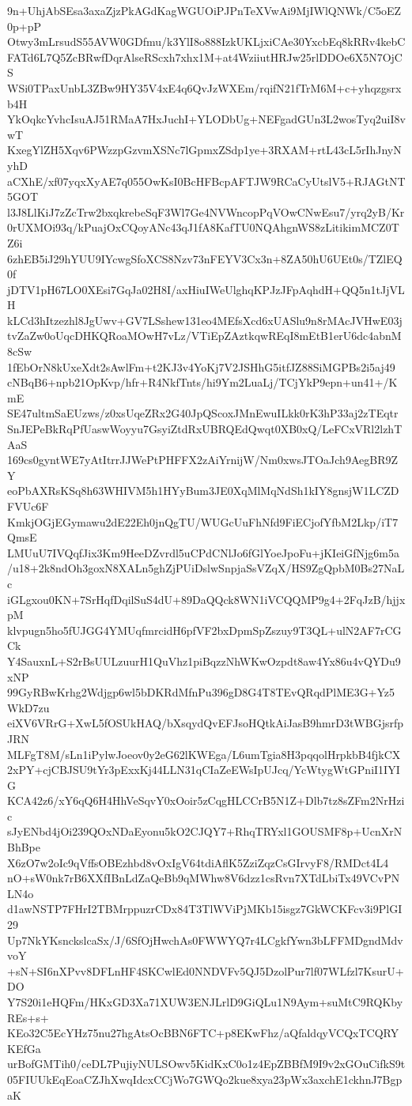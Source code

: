 9n+UhjAbSEsa3axaZjzPkAGdKagWGUOiPJPnTeXVwAi9MjIWlQNWk/C5oEZ0p+pP
Otwy3mLrsudS55AVW0GDfmu/k3YlI8o888IzkUKLjxiCAe30YxcbEq8kRRv4kebC
FATd6L7Q5ZcBRwfDqrAlseRScxh7xhx1M+at4WziiutHRJw25rlDDOe6X5N7OjCS
WSi0TPaxUnbL3ZBw9HY35V4xE4q6QvJzWXEm/rqifN21fTrM6M+c+yhqzgsrxb4H
YkOqkcYvhcIsuAJ51RMaA7HxJuchI+YLODbUg+NEFgadGUn3L2wosTyq2uiI8vwT
KxegYlZH5Xqv6PWzzpGzvmXSNc7lGpmxZSdp1ye+3RXAM+rtL43cL5rIhJnyNyhD
aCXhE/xf07yqxXyAE7q055OwKsI0BcHFBcpAFTJW9RCaCyUtslV5+RJAGtNT5GOT
l3J8LlKiJ7zZcTrw2bxqkrebeSqF3Wl7Ge4NVWncopPqVOwCNwEsu7/yrq2yB/Kr
0rUXMOi93q/kPuajOxCQoyANc43qJ1fA8KafTU0NQAhgnWS8zLitikimMCZ0TZ6i
6zhEB5iJ29hYUU9IYcwgSfoXCS8Nzv73nFEYV3Cx3n+8ZA50hU6UEt0s/TZlEQ0f
jDTV1pH67LO0XEsi7GqJa02H8I/axHiuIWeUlghqKPJzJFpAqhdH+QQ5n1tJjVLH
kLCd3hItzezhl8JgUwv+GV7LSshew131eo4MEfsXcd6xUASlu9n8rMAcJVHwE03j
tvZaZw0oUqcDHKQRoaMOwH7vLz/VTiEpZAztkqwREqI8mEtB1erU6dc4abnM8cSw
1fEbOrN8kUxeXdt2sAwlFm+t2KJ3v4YoKj7V2JSHhG5itfJZ88SiMGPBs2i5aj49
cNBqB6+npb21OpKvp/hfr+R4NkfTnts/hi9Ym2LuaLj/TCjYkP9epn+un41+/KmE
SE47ultmSaEUzws/z0xsUqeZRx2G40JpQScoxJMnEwuILkk0rK3hP33aj2zTEqtr
SnJEPeBkRqPfUaswWoyyu7GsyiZtdRxUBRQEdQwqt0XB0xQ/LeFCxVRl2lzhTAaS
169cs0gyntWE7yAtItrrJJWePtPHFFX2zAiYrnijW/Nm0xwsJTOaJch9AegBR9ZY
eoPbAXRsKSq8h63WHIVM5h1HYyBum3JE0XqMlMqNdSh1kIY8gnsjW1LCZDFVUc6F
KmkjOGjEGymawu2dE22Eh0jnQgTU/WUGcUuFhNfd9FiECjofYfbM2Lkp/iT7QmsE
LMUuU7IVQqfJix3Km9HeeDZvrdl5uCPdCNlJo6fGlYoeJpoFu+jKIeiGfNjg6m5a
/u18+2k8ndOh3goxN8XALn5ghZjPUiDslwSnpjaSsVZqX/HS9ZgQpbM0Bs27NaLc
iGLgxou0KN+7SrHqfDqilSuS4dU+89DaQQck8WN1iVCQQMP9g4+2FqJzB/hjjxpM
klvpugn5ho5fUJGG4YMUqfmrcidH6pfVF2bxDpmSpZszuy9T3QL+ulN2AF7rCGCk
Y4SauxnL+S2rBsUULzuurH1QuVhz1piBqzzNhWKwOzpdt8aw4Yx86u4vQYDu9xNP
99GyRBwKrhg2Wdjgp6wl5bDKRdMfnPu396gD8G4T8TEvQRqdPlME3G+Yz5WkD7zu
eiXV6VRrG+XwL5fOSUkHAQ/bXsqydQvEFJsoHQtkAiJasB9hmrD3tWBGjsrfpJRN
MLFgT8M/sLn1iPylwJoeov0y2eG62lKWEga/L6umTgia8H3pqqolHrpkbB4fjkCX
2xPY+cjCBJSU9tYr3pExxKj44LLN31qCIaZeEWsIpUJcq/YcWtygWtGPniI1IYIG
KCA42z6/xY6qQ6H4HhVeSqvY0xOoir5zCqgHLCCrB5N1Z+Dlb7tz8sZFm2NrHzic
sJyENbd4jOi239QOxNDaEyonu5kO2CJQY7+RhqTRYxl1GOUSMF8p+UcnXrNBhBpe
X6zO7w2oIc9qVffsOBEzhbd8vOxIgV64tdiAflK5ZziZqzCsGIrvyF8/RMDct4L4
nO+sW0nk7rB6XXfIBnLdZaQeBb9qMWhw8V6dzz1csRvn7XTdLbiTx49VCvPNLN4o
d1awNSTP7FHrI2TBMrppuzrCDx84T3TlWViPjMKb15isgz7GkWCKFcv3i9PlGI29
Up7NkYKsnckslcaSx/J/6SfOjHwchAs0FWWYQ7r4LCgkfYwn3bLFFMDgndMdvvoY
+sN+SI6nXPvv8DFLnHF4SKCwlEd0NNDVFv5QJ5DzolPur7lf07WLfzl7KsurU+DO
Y7S20i1eHQFm/HKxGD3Xa71XUW3ENJLrlD9GiQLu1N9Aym+suMtC9RQKbyREs+s+
KEo32C5EcYHz75nu27hgAtsOcBBN6FTC+p8EKwFhz/aQfaldqyVCQxTCQRYKEfGa
urBofGMTih0/ceDL7PujiyNULSOwv5KidKxC0o1z4EpZBBfM9I9v2xGOuCifkS9t
05FIUUkEqEoaCZJhXwqIdcxCCjWo7GWQo2kue8xya23pWx3axchE1ckhnJ7BgpaK
